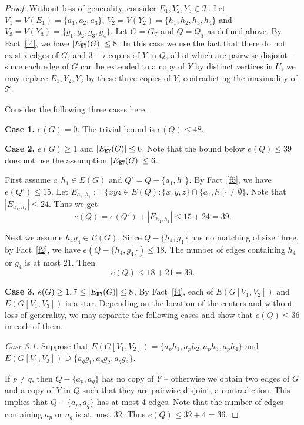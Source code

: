 \documentclass[11pt, reqno]{amsart}    	%
\theoremstyle{definition}
\def\cT{\mathcal T}
\numberwithin{equation}{section}
\begin{document}
	\begin{proof}
		Without loss of generality, consider $E_1,Y_2,Y_3\in \cT$.
		Let $ V_{1}=V(E_1)=\{a_{1},a_{2},a_{3}\}$, 
		$V_{2}=V(Y_2)=\{h_{1},h_{2},h_{3},h_4\}$ and $V_{3}=V(Y_3)=\{g_{1},g_{2},g_{3},g_4\}$. 
		Let $G=G_T$ and $Q=Q_T$ as defined above. 
		By Fact~\ref{f4}, we have $|E_{\tt EY}(G)|\le8$. 
		In this case we use the fact that there do not exist $i$ edges of $G$, and $3-i$ copies of $Y$ in $Q$, all of which are pairwise disjoint -- since each edge of $G$ can be extended to a copy of $Y$ by distinct vertices in $U$, we may replace $E_1,Y_2, Y_3$ by these three copies of $Y$, contradicting the maximality of $\cT$.  
		
		Consider the following three cases here.
		
		\textbf{Case 1.} $ e(G)=0 $.  The trivial bound is $ e(Q)\le 48 $.
		
		\textbf{Case 2.} $ e(G)\ge1$ and $|E_{\tt EY}(G)|\le6$. 
		Note that the bound below $e(Q)\le 39$ does not use the assumption $|E_{\tt EY}(G)|\le6$.
		
		First assume $ a_1h_1 \in E(G)$ and $Q'=Q-\{a_{1},h_{1}\}$. By Fact~\ref{f5}, we have $e(Q')\le15$.
		Let $ E_{a_{1}, h_1} :=\{xyz\in E(Q):\{x,y,z\}\cap\{a_{1}, h_1\}\not= \emptyset\}$.
		Note that $ |E_{a_{1},h_{1}}|\le24. $ Thus we get
		\[ e(Q)= e(Q')+|E_{h_{1},h_{1}}|\le 15+24=39.\]
		
		Next we assume $ h_4g_4 \in E(G)$. Since $Q-\{h_{4}, g_4\}$ has no matching of size three, by Fact~\ref{f2}, we have $e(Q-\{h_{4}, g_4\})\le 18$. The number of edges containing $ h_4$ or $g_4 $ is at most 21. Then
		\[e(Q)\le 18+21=39.\]
		
		\textbf{Case 3.} $ e(G)\ge1 , 7\le |E_{\tt EY}(G)|\le8$. 
		By Fact~\ref{f4}, each of $ E(G[V_{1},V_{2}])$ and $E(G[V_{1},V_{3}])$ is a star.
		Depending on the location of the centers and without loss of generality, we may separate the following cases and show that $e(Q)\le 36$ in each of them.
		
		\medskip
		\noindent\emph{Case 3.1.}
		Suppose that $ E(G[V_{1},V_{2}])=\{a_ph_1,a_ph_2,a_ph_3,a_ph_4\}$ and $E(G[V_{1},V_{3}])\supseteq\{a_qg_1,a_qg_2,a_qg_3\}$. 
		
		If $p\not=q$, then $ Q-\{a_p,a_q\} $ has no copy of $Y$ -- otherwise we obtain two edges of $G$ and a copy of $Y$ in $Q$ such that they are pairwise disjoint, a contradiction. This implies that $ Q-\{a_p,a_q\} $ has at most 4 edges.
		Note that the number of edges containing $ a_p$ or $a_q$ is at most 32. Thus $e(Q)\le 32+4=36.$
		

\end{proof}
\end{document}
